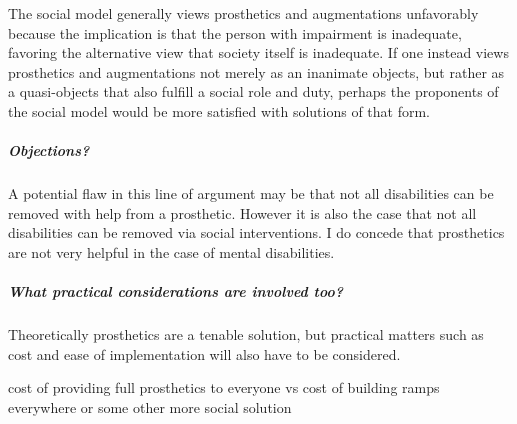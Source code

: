 \documentclass[a4paper]{article}
\begin{document}
The social model generally views prosthetics and augmentations unfavorably
because the implication is that the person with impairment is inadequate,
favoring the alternative view that society itself is inadequate.  If one
instead views prosthetics and augmentations not merely as an inanimate objects,
but rather as a quasi-objects that also fulfill a social role and duty, perhaps
the proponents of the social model would be more satisfied with solutions of
that form.

\subparagraph{Objections?}

A potential flaw in this line of argument may be that not all disabilities can
be removed with help from a prosthetic. However it is also the case that not
all disabilities can be removed via social interventions. I do concede that
prosthetics are not very helpful in the case of mental disabilities. 

\subparagraph{What practical considerations are involved too?}

Theoretically prosthetics are a tenable solution, but practical matters such as
cost and ease of implementation will also have to be considered.  

cost of providing full prosthetics to everyone vs cost of building ramps
everywhere or some other more social solution





\cleardoublepage


%
%

\end{document}

